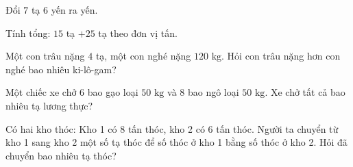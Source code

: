 \begin{ex} %
Đổi $7$ tạ $6$ yến ra yến.
\end{ex}

\begin{ex} %
Tính tổng: $15$ tạ $+ 25$ tạ theo đơn vị tấn.
\end{ex}

\begin{ex} %
Một con trâu nặng $4$ tạ, một con nghé nặng $120\text{ kg}$. Hỏi con trâu nặng hơn con nghé bao nhiêu ki-lô-gam?
\end{ex}

\begin{ex} %
Một chiếc xe chở $6$ bao gạo loại $50\text{ kg}$ và $8$ bao ngô loại $50\text{ kg}$. Xe chở tất cả bao nhiêu tạ lương thực?
\end{ex}

\begin{ex} %
Có hai kho thóc: Kho 1 có $8$ tấn thóc, kho 2 có $6$ tấn thóc. Người ta chuyển từ kho 1 sang kho 2 một số tạ thóc để số thóc ở kho 1 bằng số thóc ở kho 2. Hỏi đã chuyển bao nhiêu tạ thóc?
\end{ex}
